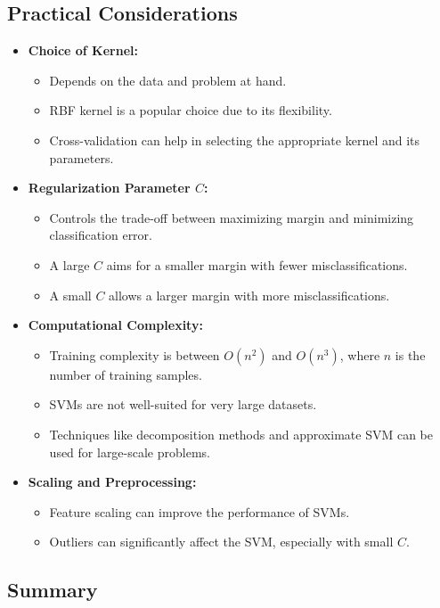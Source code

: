 \documentclass{article}
\begin{document}
\subsection{Practical Considerations}

\begin{itemize}
    \item \textbf{Choice of Kernel:}
    \begin{itemize}
        \item Depends on the data and problem at hand.
        \item RBF kernel is a popular choice due to its flexibility.
        \item Cross-validation can help in selecting the appropriate kernel and its parameters.
    \end{itemize}
    \item \textbf{Regularization Parameter $C$:}
    \begin{itemize}
        \item Controls the trade-off between maximizing margin and minimizing classification error.
        \item A large $C$ aims for a smaller margin with fewer misclassifications.
        \item A small $C$ allows a larger margin with more misclassifications.
    \end{itemize}
    \item \textbf{Computational Complexity:}
    \begin{itemize}
        \item Training complexity is between $O(n^2)$ and $O(n^3)$, where $n$ is the number of training samples.
        \item SVMs are not well-suited for very large datasets.
        \item Techniques like decomposition methods and approximate SVM can be used for large-scale problems.
    \end{itemize}
    \item \textbf{Scaling and Preprocessing:}
    \begin{itemize}
        \item Feature scaling can improve the performance of SVMs.
        \item Outliers can significantly affect the SVM, especially with small $C$.
    \end{itemize}
\end{itemize}

\subsection{Summary}
\end{document}
